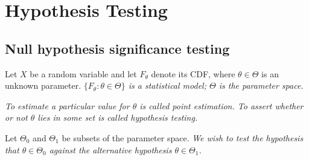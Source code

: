\chapter{Hypothesis Testing}\label{chap:hypothesis-testing}
\setcounter{page}{1}
\startcontents[chapters]
\chapcontents

\section{Null hypothesis significance testing}
Let $X$ be a random variable and let $F_{\theta}$ denote its CDF, where $\theta\in\Theta$ is an unknown parameter.
\bit
\it $\{F_\theta:\theta\in\Theta\}$ is a \emph{statistical model}; $\Theta$ is the \emph{parameter space}.
\eit

\vspace*{1ex}
\bit
\it To estimate a particular value for $\theta$ is called \emph{point estimation}.
\it To assert whether or not $\theta$ lies in some set is called \emph{hypothesis testing}.
\eit

\vspace*{1ex}
Let $\Theta_0$ and $\Theta_1$ be subsets of the parameter space.
\bit
\it We wish to test the hypothesis that $\theta\in\Theta_0$ against the alternative hypothesis $\theta\in\Theta_1$.
\eit

%
\vspace*{1ex}


